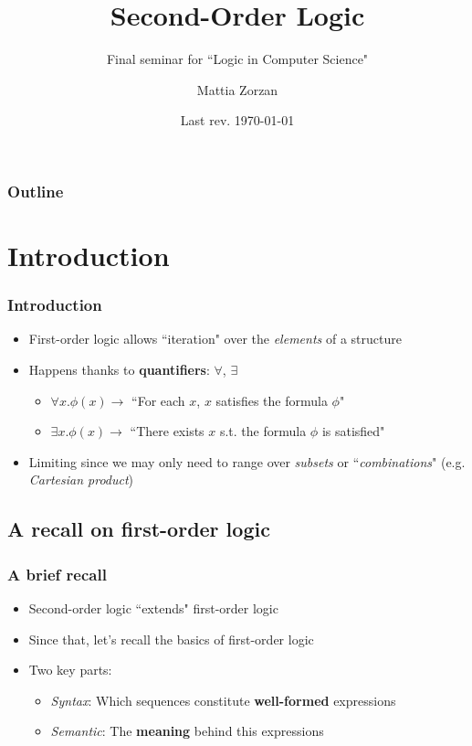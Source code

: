 \documentclass{beamer}
\title{Second-Order Logic}
\subtitle{Final seminar for ``Logic in Computer Science"}
\author{Mattia Zorzan}
\institute{University of Verona}
\date{Last rev. \today}
\begin{document}
    \begin{frame}
        \titlepage
    \end{frame}

    \begin{frame}
        \frametitle{Outline}
        \tableofcontents
    \end{frame}

    \section{Introduction}
        \begin{frame}
            \frametitle{Introduction}
            \begin{itemize}
                \item First-order logic allows ``iteration" over the \textit{elements} of a structure
                \item Happens thanks to \textbf{quantifiers}: $ \forall $, $ \exists $
                    \begin{itemize}
                        \item $ \forall x. \phi(x) \rightarrow $ ``For each $ x $, $ x $ satisfies the formula $ \phi $"
                        \item $ \exists x. \phi(x) \rightarrow $ ``There exists $ x $ s.t. the formula $ \phi $ is satisfied"
                    \end{itemize}
                \item Limiting since we may only need to range over \textit{subsets} or ``\textit{combinations}" (e.g. \textit{Cartesian product})
            \end{itemize}
        \end{frame}

        \subsection{A recall on first-order logic}
            \begin{frame}
                \frametitle{A brief recall}
                \begin{itemize}
                    \item Second-order logic ``extends" first-order logic
                    \item Since that, let's recall the basics of first-order logic
                    \item Two key parts:
                        \begin{itemize}
                            \item \textit{Syntax}: Which sequences constitute \textbf{well-formed} expressions
                            \item \textit{Semantic}: The \textbf{meaning} behind this expressions
                        \end{itemize}
                \end{itemize}
            \end{frame}
\end{document}
